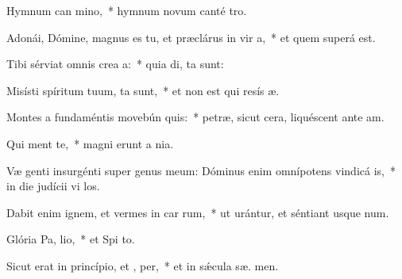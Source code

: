 \item Hymnum can mino,~* hymnum novum canté  tro.
\item Adonái, Dómine, magnus es tu, et præclárus in vir a,~* et quem superá  est.
\item Tibi sérviat omnis crea a:~* quia di,  ta sunt:
\item Misísti spíritum tuum,  ta sunt,~* et non est qui resís  æ.
\item Montes a fundaméntis movebún  quis:~* petræ, sicut cera, liquéscent ante  am.
\item Qui  ment te,~* magni erunt a   nia.
\item Væ genti insurgénti super genus meum: Dóminus enim omnípotens vindicá  is,~* in die judícii vi los.
\item Dabit enim ignem, et vermes in car rum,~* ut urántur, et séntiant usque  num.
\item Glória Pa,  lio,~* et Spi to.
\item Sicut erat in princípio, et ,  per,~* et in sǽcula sæ. men.
